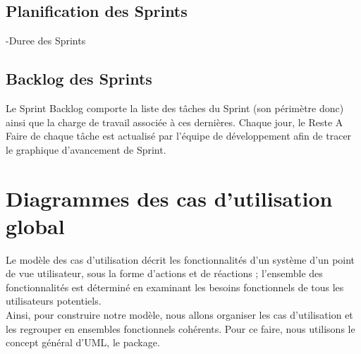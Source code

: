 \subsection{Planification des Sprints}
-Duree des Sprints
\subsection{Backlog des Sprints}
Le Sprint Backlog comporte la liste des tâches du Sprint (son périmètre donc) ainsi que la charge de travail associée à ces dernières. Chaque jour, le Reste A Faire de chaque tâche est actualisé par l’équipe de développement afin de tracer le graphique d’avancement de Sprint.


\section{Diagrammes des cas d'utilisation global}
Le modèle des cas d’utilisation décrit les fonctionnalités d’un système d’un point de vue utilisateur, sous la forme d’actions et de réactions ; l’ensemble des fonctionnalités est déterminé en examinant les besoins fonctionnels de tous les utilisateurs potentiels.\\
Ainsi, pour construire notre modèle, nous allons organiser les cas d’utilisation et les regrouper en ensembles fonctionnels cohérents. Pour ce faire, nous utilisons le concept général d’UML, le package.

